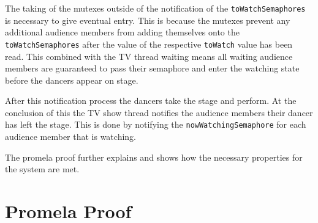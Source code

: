 \documentclass[12pt,a4paper]{scrartcl}
\begin{document}
The taking of the mutexes outside of the notification of the \texttt{toWatchSemaphores} is necessary to give eventual entry.
This is because the mutexes prevent any additional audience members from adding themselves onto the \texttt{toWatchSemaphores} after the value of the respective \texttt{toWatch} value has been read.
This combined with the TV thread waiting means all waiting audience members are guaranteed to pass their semaphore and enter the watching state before the dancers appear on stage.

After this notification process the dancers take the stage and perform.
At the conclusion of this the TV show thread notifies the audience members their dancer has left the stage.
This is done by notifying the \texttt{nowWatchingSemaphore} for each audience member that is watching.

The promela proof further explains and shows how the necessary properties for the system are met.

\section{Promela Proof}
\end{document}
